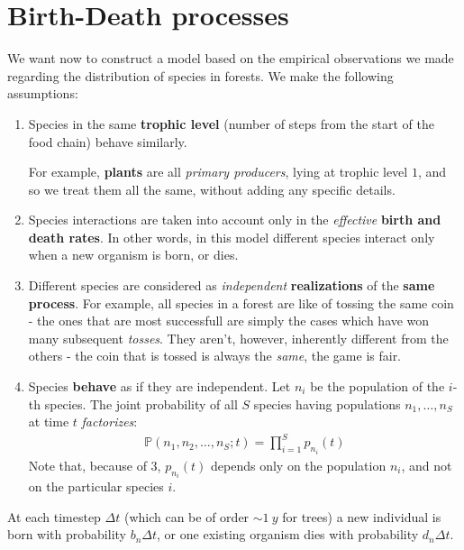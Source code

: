 \documentclass[../../main.tex]{subfiles}
\begin{document}
\section{Birth-Death processes}
We want now to construct a model based on the empirical observations we made regarding the distribution of species in forests. We make the following assumptions:
\begin{enumerate}
    \item Species in the same \textbf{trophic level} (number of steps from the start of the food chain) behave similarly.
    
    For example, \textbf{plants}  are all \textit{primary producers}, lying at trophic level $1$, and so we treat them all the same, without adding any specific details.
    \item Species interactions are taken into account only in the \textit{effective} \textbf{birth and death rates}. In other words, in this model different species interact only when a new organism is born, or dies.
    \item Different species are considered as \textit{independent} \textbf{realizations}  of the \textbf{same process}. For example, all species in a forest are like  of tossing the same coin - the ones that are most successfull are simply the  cases which have won many subsequent \textit{tosses}. They aren't, however, inherently different from the others - the coin that is tossed is always the \textit{same}, the game is fair.
    \item Species \textbf{behave} as if they are independent. Let $n_i$ be the population of the $i$-th species. The joint probability of all $S$ species having populations $n_1,\dots,n_S$ at time $t$ \textit{factorizes}:
    \begin{align*}
        \mathbb{P}(n_1, n_2, \dots, n_S; t) = \prod_{i=1}^S p_{n_i}(t)    
    \end{align*}   
    Note that, because of $3$, $p_{n_i}(t)$ depends only on the population $n_i$, and not on the particular species $i$. 
\end{enumerate}
At each timestep $\Delta t$ (which can be of order $\sim \SI{1}{y}$ for trees) a new individual is born with probability $b_n \Delta t$, or one existing organism dies with probability $d_n \Delta t$.
\end{document}
